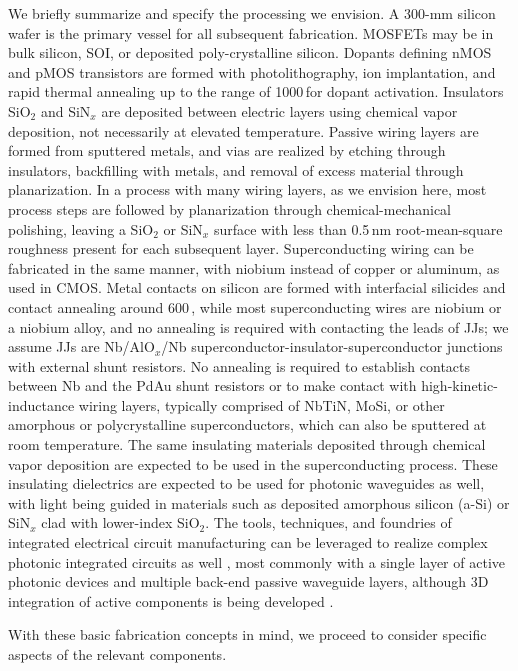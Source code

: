 \documentclass[twocolumn]{article}
\begin{document}
We briefly summarize and specify the processing we envision. A 300-mm silicon wafer is the primary vessel for all subsequent fabrication. MOSFETs may be in bulk silicon, SOI, or deposited poly-crystalline silicon. Dopants defining nMOS and pMOS transistors are formed with photolithography, ion implantation, and rapid thermal annealing up to the range of 1000\,\textcelsius for dopant activation. Insulators SiO$_2$ and SiN$_x$ are deposited between electric layers using chemical vapor deposition, not necessarily at elevated temperature. Passive wiring layers are formed from sputtered metals, and vias are realized by etching through insulators, backfilling with metals, and removal of excess material through planarization. In a process with many wiring layers, as we envision here, most process steps are followed by planarization through chemical-mechanical polishing, leaving a SiO$_2$ or SiN$_x$ surface with less than 0.5\,nm root-mean-square roughness present for each subsequent layer. Superconducting wiring can be fabricated in the same manner, with niobium instead of copper or aluminum, as used in CMOS. Metal contacts on silicon are formed with interfacial silicides and contact annealing around 600\,\textcelsius, while most superconducting wires are niobium or a niobium alloy, and no annealing is required with contacting the leads of JJs; we assume JJs are Nb/AlO$_x$/Nb superconductor-insulator-superconductor junctions with external shunt resistors. No annealing is required to establish contacts between Nb and the PdAu shunt resistors or to make contact with high-kinetic-inductance wiring layers, typically comprised of NbTiN, MoSi, or other amorphous or polycrystalline superconductors, which can also be sputtered at room temperature. The same insulating materials deposited through chemical vapor deposition are expected to be used in the superconducting process. These insulating dielectrics are expected to be used for photonic waveguides as well, with light being guided in materials such as deposited amorphous silicon (a-Si) or SiN$_x$ clad with lower-index SiO$_2$. The tools, techniques, and foundries of integrated electrical circuit manufacturing can be leveraged to realize complex photonic integrated circuits as well \cite{orma2012}, most commonly with a single layer of active photonic devices and multiple back-end passive waveguide layers, although 3D integration of active components is being developed \cite{zhsa2020}. 

With these basic fabrication concepts in mind, we proceed to consider specific aspects of the relevant components. 
\end{document}

